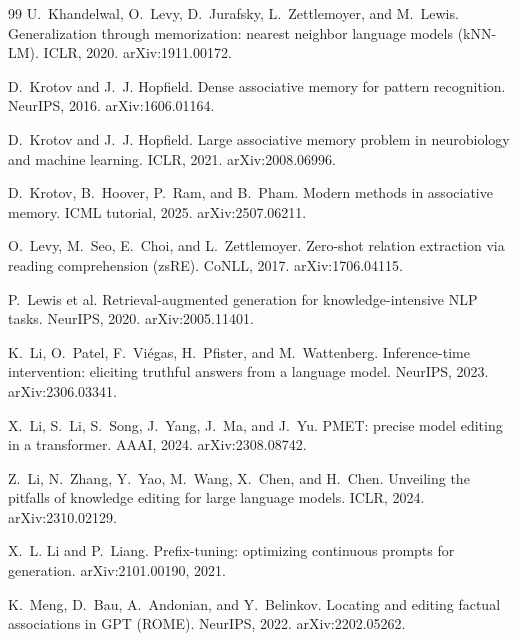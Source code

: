 \documentclass[10pt,twocolumn]{article}
\theoremstyle{remark}
\begin{document}
\begin{thebibliography}{99}
U.~Khandelwal, O.~Levy, D.~Jurafsky, L.~Zettlemoyer, and M.~Lewis.
\newblock Generalization through memorization: nearest neighbor language models (kNN-LM).
\newblock ICLR, 2020. arXiv:1911.00172.

D.~Krotov and J.~J. Hopfield.
\newblock Dense associative memory for pattern recognition.
\newblock NeurIPS, 2016. arXiv:1606.01164.

D.~Krotov and J.~J. Hopfield.
\newblock Large associative memory problem in neurobiology and machine learning.
\newblock ICLR, 2021. arXiv:2008.06996.

D.~Krotov, B.~Hoover, P.~Ram, and B.~Pham.
\newblock Modern methods in associative memory.
\newblock ICML tutorial, 2025. arXiv:2507.06211.

O.~Levy, M.~Seo, E.~Choi, and L.~Zettlemoyer.
\newblock Zero-shot relation extraction via reading comprehension (zsRE).
\newblock CoNLL, 2017. arXiv:1706.04115.

P.~Lewis et al.
\newblock Retrieval-augmented generation for knowledge-intensive NLP tasks.
\newblock NeurIPS, 2020. arXiv:2005.11401.

K.~Li, O.~Patel, F.~Vi\'egas, H.~Pfister, and M.~Wattenberg.
\newblock Inference-time intervention: eliciting truthful answers from a language model.
\newblock NeurIPS, 2023. arXiv:2306.03341.

X.~Li, S.~Li, S.~Song, J.~Yang, J.~Ma, and J.~Yu.
\newblock PMET: precise model editing in a transformer.
\newblock AAAI, 2024. arXiv:2308.08742.

Z.~Li, N.~Zhang, Y.~Yao, M.~Wang, X.~Chen, and H.~Chen.
\newblock Unveiling the pitfalls of knowledge editing for large language models.
\newblock ICLR, 2024. arXiv:2310.02129.

X.~L. Li and P.~Liang.
\newblock Prefix-tuning: optimizing continuous prompts for generation.
\newblock arXiv:2101.00190, 2021.

K.~Meng, D.~Bau, A.~Andonian, and Y.~Belinkov.
\newblock Locating and editing factual associations in GPT (ROME).
\newblock NeurIPS, 2022. arXiv:2202.05262.


\end{thebibliography}
\end{document}

